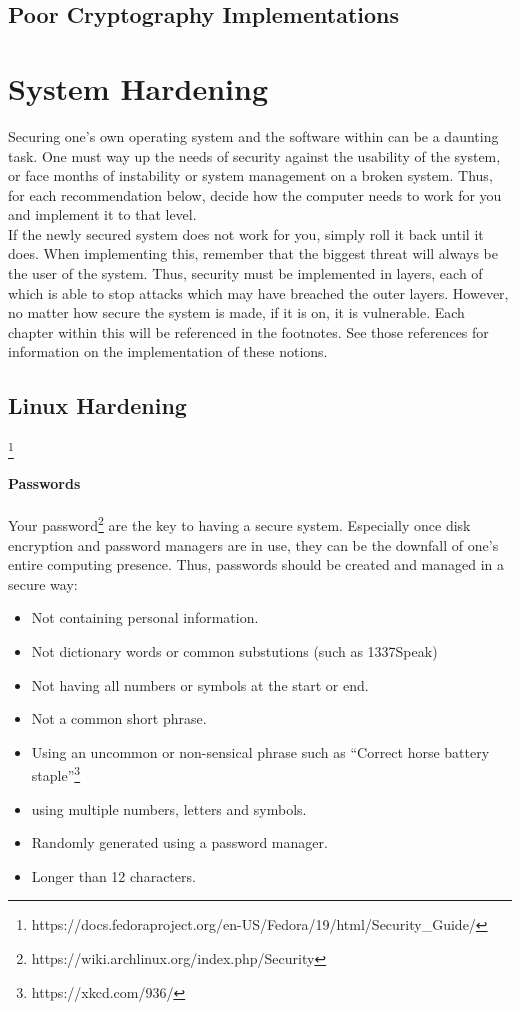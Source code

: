 \documentclass[a4paper,11pt]{book}
\begin{document}
	\section{Poor Cryptography Implementations}
\chapter{System Hardening}
	Securing one's own operating system and the software within can be a daunting task. 
	One must way up the needs of security against the usability of the system, or face months of instability or system management on a broken system. 
	Thus, for each recommendation below, decide how the computer needs to work for you and implement it to that level.\\ 
	If the newly secured system does not work for you, simply roll it back until it does. 
	When implementing this, remember that the biggest threat will always be the user of the system. 
	Thus, security must be implemented in layers, each of which is able to stop attacks which may have breached the outer layers. However, no matter how secure the system is made, if it is on, it is vulnerable. 
	Each chapter within this will be referenced in the footnotes. See those references for information on the implementation of these notions. 
	\section{Linux Hardening} \footnote{https://docs.fedoraproject.org/en-US/Fedora/19/html/Security\_Guide/}
		\subsubsection{Passwords} 
			Your password\footnote{https://wiki.archlinux.org/index.php/Security} are the key to having a secure system. 
			Especially once disk encryption and password managers are in use, they can be the downfall of one's entire computing presence. 
			Thus, passwords should be created and managed in a secure way:
			\begin{itemize}
				\item Not containing personal information.
				\item Not dictionary words or common substutions (such as 1337Speak)
				\item Not having all numbers or symbols at the start or end. 
				\item Not a common short phrase. 
				\item Using an uncommon or non-sensical phrase such as ``Correct horse battery staple''\footnote{https://xkcd.com/936/}
				\item using multiple numbers, letters and symbols. 
				\item Randomly generated using a password manager. %
				\item Longer than 12 characters. 
			\end{itemize}
\end{document}
